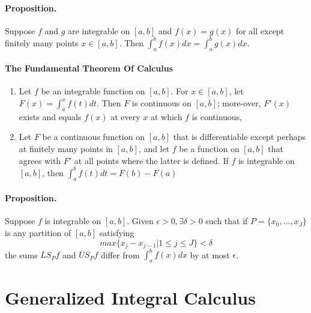 \documentclass[11pt]{article}
\begin{document}
\paragraph{Proposition.} Suppose $f$ and $g$ are integrable on $[a,b]$ and $f(x) = g(x)$ for all except finitely many points $x\in [a,b]$. Then $\int_a^bf(x)dx = \int_a^bg(x)dx$. 

\paragraph{The Fundamental Theorem Of Calculus}
\begin{enumerate}
    \item Let $f$ be an integrable function on $[a,b]$. For $x\in [a,b]$, let $F(x) = \int_a^xf(t)dt$. Then $F$ is continuous on $[a,b]$; more-over, $F'(x)$ exists and equals $f(x)$ at every $x$ at which $f$ is continuous,
    \item Let $F$ be a continuous function on $[a,b]$ that is differentiable except perhaps at finitely many points in $[a,b]$, and let $f$ be a function on $[a,b]$ that agrees with $F'$ at all points where the latter is defined. If $f$ is integrable on $[a,b]$, then $\int_a^bf(t)dt=F(b)-F(a)$
\end{enumerate}

\paragraph{Proposition.} Suppose $f$ is integrable on $[a,b]$. Given $\epsilon>0, \exists \delta > 0$ such that if $P= \{x_0,...,x_J\}$ is any partition of $[a,b]$ satisfying
\begin{equation*}
    max\{x_j-x_{j-1} | 1\leq j \leq J\} < \delta
\end{equation*}
the sums $LS_Pf$ and $US_Pf$ differ from $\int_a^bf(x)dx$ by at most $\epsilon$.

\section{Generalized Integral Calculus}
\end{document}
